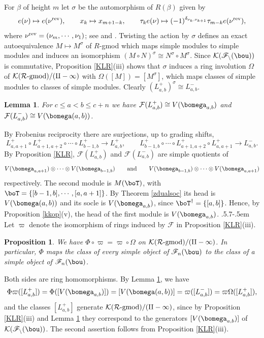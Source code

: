 \documentclass[11pt,reqno]{amsart}
\makeatletter
\newtheorem*{lem}{Lemma}
\newtheorem*{prop}{Proposition}
\theoremstyle{definition} \newtheorem*{defn}{Definition}
\theoremstyle{definition}
\newenvironment{pf}{\proof}{\endproof}
\numberwithin{equation}{section}
\def\subsection{\def\@secnumfont{\bfseries}\@startsection{subsection}{2}%
  {\parindent}{.5\linespacing\@plus.7\linespacing}{-.5em}%
  {\normalfont\bfseries}}
\makeatother
\begin{document}
\subsubsection{}
For $\beta$ of height $m$ let $\sigma$ be the automorphism of $R(\beta)$ given by
$$e(\nu)\mapsto e(\nu^{\rm rev}),\qquad x_k\mapsto x_{m+1-k},\qquad \tau_ke(\nu)\mapsto(-1)^{\delta_{\nu_k,\nu_{k+1}}}\tau_{m-k}e(\nu^{\rm rev}),$$
where $\nu^{\rm rev}=(\nu_m,\cdots,\nu_1)$; see \cite[Section 2.1]{KL09} and \cite[Section 1.1.4, (1.32)]{LV11}. Twisting the action by $\sigma$ defines an exact autoequivalence $M\mapsto M^\sigma$ of $R$-gmod which maps simple modules to simple modules  and induces an isomorphism $(M\circ N)^\sigma\cong N^\sigma\circ M^\sigma$. Since $\cal K(\mathscr F_n(\bou))$ is commutative, Proposition \ref{KLR}(iii) shows that $\sigma$ induces a ring involution $\Omega$ of $\cal K(R\text{-gmod})/(q-1)$ with $\Omega([M])=[M^\sigma]$, which maps classes of simple modules to classes of simple modules. Clearly $(L^+_{a,b})^\sigma\cong L^-_{a,b}$.
\begin{lem}\label{Lpm}
For $c\le a<b\le c+n$ we have $\mathcal F(L^+_{a,b})\cong V(\bomega_{a,b})$ and $\mathcal F(L^-_{a,b})\cong V(\bomega(a,b))$.
\end{lem}
\begin{pf}
By Frobenius reciprocity there are surjections, up to grading shifts,
$$L_{a,a+1}^+\circ L_{a+1,a+2}^+\circ\cdots\circ L_{b-1,b}^+\to L^+_{a,b},\qquad L_{b-1,b}^+\circ\cdots\circ L_{a+1,a+2}^+\circ L_{a,a+1}^+\to L^-_{a,b}.$$
By Proposition \ref{KLR}, $\mathcal F(L^+_{a,b})$ and $\mathcal F(L^-_{a,b})$ are simple quotients of
$$V(\bomega_{a,a+1})\otimes\cdots\otimes V(\bomega_{b-1,b})\qquad\text{and}\qquad V(\bomega_{b-1,b})\otimes\cdots\otimes V(\bomega_{a,a+1})$$
respectively. The second module is $M(\boT)$, with $\boT=\{[b-1,b],\cdots, [a,a+1]\}$. By Theorem \ref{zdualsoc} its head is $V(\bomega(a,b))$ and its socle is $V(\bomega_{a,b})$, since $\boT^\dagger = \{[a,b]\}$. Hence, by Proposition \ref{kkop}(v), the head of the first module is $V(\bomega_{a,b})$.
\end{pf}
\subsection{} Let $\varpi$ denote the isomorphism of rings induced by $\mathcal F$ in Proposition \ref{KLR}(iii).
\begin{prop}\label{Phistar}
We have $\Phi\circ\varpi=\varpi\circ\Omega$ on $\cal K(R\text{-gmod})/(q-1)$. In particular, $\Phi$ maps the class of every simple object of $\mathscr F_n(\bou)$ to the class of a simple object of $\mathscr F_n(\bou)$.
\end{prop}
\begin{pf}
Both sides are ring homomorphisms. By Lemma \ref{Lpm}, we have
$$\Phi\varpi([L^+_{a,b}])=\Phi([V(\bomega_{a,b})])=[V(\bomega(a,b))]=\varpi([L^-_{a,b}])=\varpi\Omega([L^+_{a,b}]),$$ and the classes $[L^+_{a,b}]$ generate $\cal K(R\text{-gmod})/(q-1)$, since by Proposition \ref{KLR}(iii) and Lemma \ref{Lpm} they correspond to the generators $[V(\bomega_{a,b})]$ of $\cal K(\mathscr F_n(\bou))$. The second assertion follows from Proposition \ref{KLR}(iii).
\end{pf}
\end{document}
